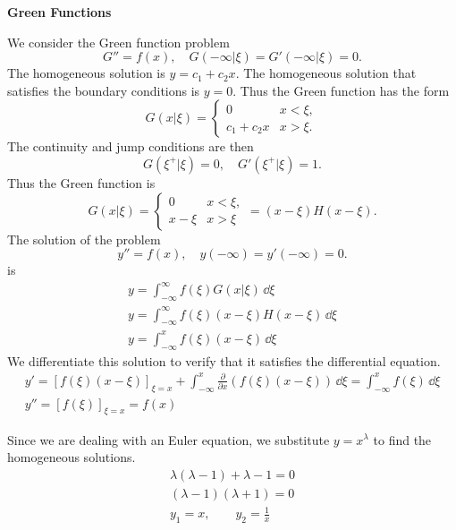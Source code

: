 {%
\begin{large}
  \noindent
  \textbf{Green Functions}
\end{large}



\begin{Solution}
  \label{solution y=f y=y=0}
  We consider the Green function problem
  \[
  G'' = f(x), \quad G(-\infty|\xi) = G'(-\infty|\xi) = 0.
  \]
  The homogeneous solution is $y = c_1 + c_2 x$.  The homogeneous solution
  that satisfies the boundary conditions is $y = 0$.  Thus the Green function
  has the form
  \[
  G(x|\xi) = 
  \begin{cases}
    0 &x < \xi, \\
    c_1 + c_2 x & x > \xi.
  \end{cases}
  \]
  The continuity and jump conditions are then
  \[
  G(\xi^+|\xi) = 0, \quad G'(\xi^+|\xi) = 1.
  \]
  Thus the Green function is
  \[
  G(x|\xi) = 
  \begin{cases}
    0 &x < \xi, \\
    x - \xi & x > \xi
  \end{cases}
  = (x - \xi) H(x - \xi).
  \]
  The solution of the problem 
  \[
  y'' = f(x), \quad y(-\infty) = y'(-\infty) = 0.
  \]
  is
  \begin{gather*}
    y = \int_{-\infty}^\infty f(\xi) G(x|\xi) \,\dd \xi \\
    y = \int_{-\infty}^\infty f(\xi) (x - \xi) H(x - \xi) \,\dd \xi \\
    \boxed{
      y = \int_{-\infty}^x f(\xi) (x - \xi) \,\dd \xi 
      }
  \end{gather*}
  We differentiate this solution to verify that it satisfies the differential
  equation.
  \begin{gather*}
    y' = \left[ f(\xi) (x - \xi) \right]_{\xi = x} 
    + \int_{-\infty}^x \frac{\partial}{\partial x} \left( f(\xi) (x - \xi) 
    \right) \,\dd \xi 
    = \int_{-\infty}^x f(\xi) \,\dd \xi \\
    y'' = \left[ f(\xi) \right]_{\xi = x} = f(x)
  \end{gather*}
\end{Solution}






\begin{Solution}
  \label{solution y+1xy-1x2y=x2}
  Since we are dealing with an Euler equation, we substitute $y = x^\lambda$
  to find the homogeneous solutions.
  \begin{gather*}
    \lambda(\lambda-1) + \lambda - 1 = 0 \\
    (\lambda-1)(\lambda+1) = 0 \\
    y_1 = x, \qquad y_2 = \frac{1}{x}
  \end{gather*}


\end{Solution}}
